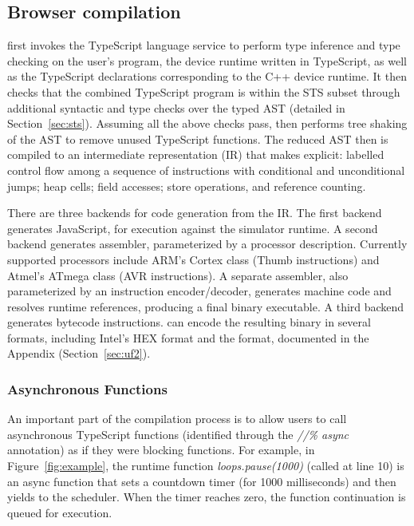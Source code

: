 \subsection{Browser compilation}

\MC first invokes the TypeScript language service to perform type inference and type checking on the 
user's program, the device runtime written in TypeScript, as well as the TypeScript declarations
corresponding to the C++ device runtime. It then checks that the
combined TypeScript program is within the STS subset through additional syntactic and type checks over the typed AST (detailed in Section~\ref{sec:sts}).  Assuming all the
above checks pass, \MC then performs tree shaking of the AST to remove unused TypeScript functions.
The reduced AST then is compiled to an intermediate representation (IR) that makes explicit: labelled control 
flow among a sequence of instructions with conditional and unconditional jumps; heap cells; field accesses; store operations,
and reference counting.


There are three backends for code generation from the IR. The first backend generates JavaScript,
for execution against the simulator runtime.  A second backend generates assembler, parameterized by a
processor description.  Currently supported processors include ARM's Cortex class (Thumb instructions)
and Atmel's ATmega class (AVR instructions). A separate assembler, also parameterized by an instruction
encoder/decoder, generates machine code and resolves runtime references, producing a final binary executable. A third backend generates bytecode instructions.
\MC can encode the resulting binary in several formats, 
including Intel's HEX format and the \UF format, documented in the Appendix (Section~\ref{sec:uf2}).

\subsubsection{Asynchronous Functions}

An important part of the compilation process is to allow users to call asynchronous 
TypeScript functions (identified through the \emph{//\% async} annotation) 
as if they were blocking functions.  For example, in Figure~\ref{fig:example}, the runtime 
function \emph{loops.pause(1000)} (called at line 10) 
is an async function that sets a countdown timer (for 1000 milliseconds) 
and then yields to the scheduler. When the timer 
reaches zero, the function continuation is queued for execution. 

